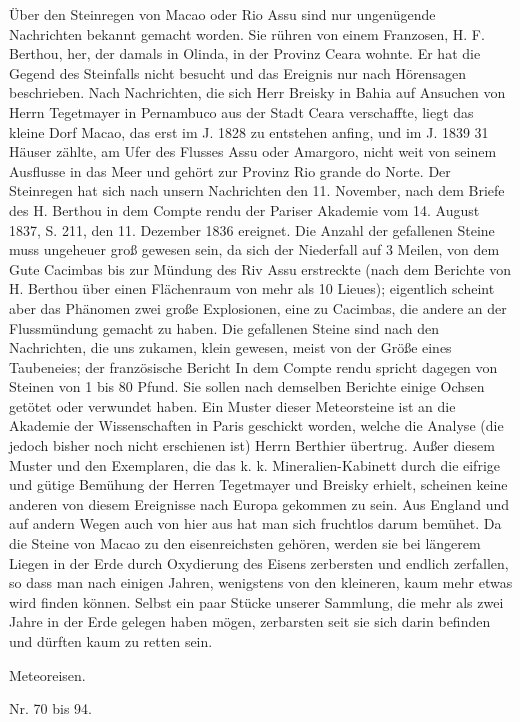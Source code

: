 \documentclass[a4paper, 11pt, oneside, polutonikogreek, german]{article}
\begin{document}
Über den Steinregen von Macao oder Rio Assu sind nur ungenügende Nachrichten bekannt gemacht worden. Sie rühren von einem Franzosen, H. F. Berthou, her, der damals in Olinda, in der Provinz Ceara wohnte. Er hat die Gegend des Steinfalls nicht besucht und das Ereignis nur nach Hörensagen beschrieben. Nach Nachrichten, die sich Herr Breisky in Bahia auf Ansuchen von Herrn Tegetmayer in Pernambuco aus der Stadt Ceara verschaffte, liegt das kleine Dorf Macao, das erst im J. 1828 zu entstehen anfing, und im J. 1839 31 Häuser zählte, am Ufer des Flusses Assu oder Amargoro, nicht weit von seinem Ausflusse in das Meer und gehört zur Provinz Rio grande do Norte. Der Steinregen hat sich nach unsern Nachrichten den 11. November, nach dem Briefe des H. Berthou in dem Compte rendu der Pariser Akademie vom 14. August 1837, S. 211, den 11. Dezember 1836 ereignet. Die Anzahl der gefallenen Steine muss ungeheuer groß gewesen sein, da sich der Niederfall auf 3 Meilen, von dem Gute Cacimbas bis zur Mündung des Riv Assu erstreckte (nach dem Berichte von H. Berthou über einen Flächenraum von mehr als 10 Lieues); eigentlich scheint aber das Phänomen zwei große Explosionen, eine zu Cacimbas, die andere an der Flussmündung gemacht zu haben. Die gefallenen Steine sind nach den Nachrichten, die uns zukamen, klein gewesen, meist von der Größe eines Taubeneies; der französische Bericht In dem Compte rendu spricht dagegen von Steinen von 1 bis 80 Pfund. Sie sollen nach demselben Berichte einige Ochsen getötet oder verwundet haben. Ein Muster dieser Meteorsteine ist an die Akademie der Wissenschaften in Paris geschickt worden, welche die Analyse (die jedoch bisher noch nicht erschienen ist) Herrn Berthier übertrug. Außer diesem Muster und den Exemplaren, die das k. k. Mineralien-Kabinett durch die eifrige und gütige Bemühung der Herren Tegetmayer und Breisky erhielt, scheinen keine anderen von diesem Ereignisse nach Europa gekommen zu sein. Aus England und auf andern Wegen auch von hier aus hat man sich fruchtlos darum bemühet. Da die Steine von Macao zu den eisenreichsten gehören, werden sie bei längerem Liegen in der Erde durch Oxydierung des Eisens zerbersten und endlich zerfallen, so dass man nach einigen Jahren, wenigstens von den kleineren, kaum mehr etwas wird finden können. Selbst ein paar Stücke unserer Sammlung, die mehr als zwei Jahre in der Erde gelegen haben mögen, zerbarsten seit sie sich darin befinden und dürften kaum zu retten sein.
\begin{center}
{\LARGE Meteoreisen.}

Nr. 70 bis 94.
\end{center}
\end{document}
